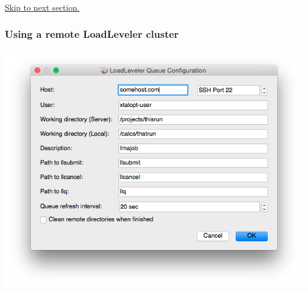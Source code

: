 \hyperlink{tut-xo_files}{Skip to next section.}\hypertarget{tut-xo_remotell}{}\subsubsection{Using a remote Load\+Leveler cluster}\label{tut-xo_remotell}
 
\begin{DoxyImageNoCaption}
  \mbox{\includegraphics[width=\textwidth]{opt-set-ll.png}}
\end{DoxyImageNoCaption}


